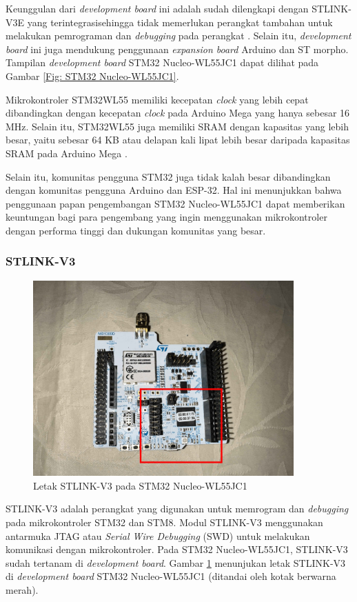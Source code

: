 Keunggulan dari \textit{development board} ini adalah sudah dilengkapi dengan STLINK-V3E yang terintegrasisehingga tidak memerlukan perangkat tambahan untuk melakukan pemrograman dan \textit{debugging} pada perangkat \cite{STMicroelectronics2022}. Selain itu, \textit{development board} ini juga mendukung penggunaan \textit{expansion board} Arduino dan ST morpho. Tampilan \textit{development board} STM32 Nucleo-WL55JC1 dapat dilihat pada Gambar \ref{Fig: STM32 Nucleo-WL55JC1}.

Mikrokontroler STM32WL55 memiliki kecepatan \textit{clock} yang lebih cepat dibandingkan dengan kecepatan \textit{clock} pada Arduino Mega yang hanya sebesar 16 MHz. Selain itu, STM32WL55 juga memiliki SRAM dengan kapasitas yang lebih besar, yaitu sebesar 64 KB atau delapan kali lipat lebih besar daripada kapasitas SRAM pada Arduino Mega \cite{STMicroelectronics2022b}.

Selain itu, komunitas pengguna STM32 juga tidak kalah besar dibandingkan dengan komunitas pengguna Arduino dan ESP-32. Hal ini menunjukkan bahwa penggunaan papan pengembangan STM32 Nucleo-WL55JC1 dapat memberikan keuntungan bagi para pengembang yang ingin menggunakan mikrokontroler dengan performa tinggi dan dukungan komunitas yang besar.

\subsubsection{STLINK-V3}
\begin{figure}[H]
	\centering
	\includegraphics[width=10cm]{contents/chapter-2/stlink-in-wl55.jpg}
	\caption{Letak STLINK-V3 pada STM32 Nucleo-WL55JC1}
	\label{Fig: stlink-in-wl55}
\end{figure}

STLINK-V3 adalah perangkat yang digunakan untuk memrogram dan \textit{debugging} pada mikrokontroler STM32 dan STM8. Modul STLINK-V3 menggunakan antarmuka JTAG atau \textit{Serial Wire Debugging} (SWD) untuk melakukan komunikasi dengan mikrokontroler. Pada STM32 Nucleo-WL55JC1, STLINK-V3 sudah tertanam di \textit{development board}. Gambar \ref{Fig: stlink-in-wl55} menunjukan letak STLINK-V3 di \textit{development board} STM32 Nucleo-WL55JC1 (ditandai oleh kotak berwarna merah).

